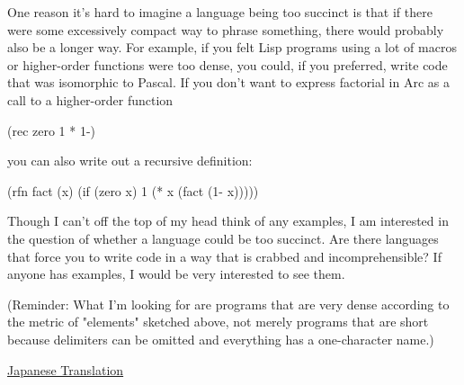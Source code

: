 One reason it's
                  hard to imagine a language being too succinct is that if there
                  were some excessively compact way to phrase something, there
                  would probably also be a longer way. For example, if you felt
                  Lisp programs using a lot of macros or higher-order functions
                  were too dense, you could, if you preferred, write code that
                  was isomorphic to Pascal. If you don't want to express
                  factorial in Arc as a call to a higher-order function
                  
                    
(rec zero 1 * 1-)

                  
                  you can also write out a recursive definition:
                  
                    
(rfn fact (x) (if (zero x) 1 (* x (fact (1- x)))))

                  
                  Though I can't off the top of my head think of any examples, I
                  am interested in the question of whether a language could be
                  too succinct. Are there languages that force you to write code
                  in a way that is crabbed and incomprehensible? If anyone has
                  examples, I would be very interested to see them.

(Reminder:
                  What I'm looking for are programs that are very dense
                  according to the metric of "elements" sketched above, not
                  merely programs that are short because delimiters can be
                  omitted and everything has a one-character name.)


                  



              
            
          

            
              
            
            
              
                
              
              
              
                \href{http://www.shiro.dreamhost.com/scheme/trans/power-j.html}{Japanese Translation}


              
            
            
              
